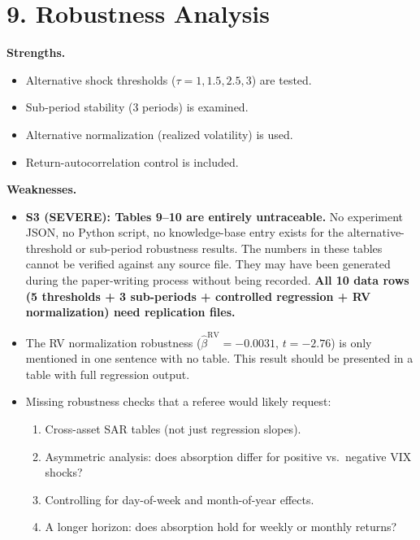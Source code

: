 \documentclass[12pt,a4paper]{article}
\begin{document}
\section*{9. Robustness Analysis}

\textbf{Strengths.}
\begin{itemize}[nosep]
  \item Alternative shock thresholds ($\tau = 1, 1.5, 2.5, 3$) are tested.
  \item Sub-period stability (3 periods) is examined.
  \item Alternative normalization (realized volatility) is used.
  \item Return-autocorrelation control is included.
\end{itemize}

\textbf{Weaknesses.}
\begin{itemize}[nosep]
  \item \textcolor{errorred}{\textbf{S3 (SEVERE): Tables 9--10 are entirely untraceable.}}  No experiment JSON, no Python script, no knowledge-base entry exists for the alternative-threshold or sub-period robustness results.  The numbers in these tables cannot be verified against any source file.  They may have been generated during the paper-writing process without being recorded.  \textbf{All 10 data rows (5 thresholds + 3 sub-periods + controlled regression + RV normalization) need replication files.}
  \item The RV normalization robustness ($\hat{\beta}^{\text{RV}} = -0.0031$, $t = -2.76$) is only mentioned in one sentence with no table.  This result should be presented in a table with full regression output.
  \item Missing robustness checks that a referee would likely request:
  \begin{enumerate}[nosep]
    \item Cross-asset SAR tables (not just regression slopes).
    \item Asymmetric analysis: does absorption differ for positive vs.\ negative VIX shocks?
    \item Controlling for day-of-week and month-of-year effects.
    \item A longer horizon: does absorption hold for weekly or monthly returns?
  \end{enumerate}
\end{itemize}

\end{document}
